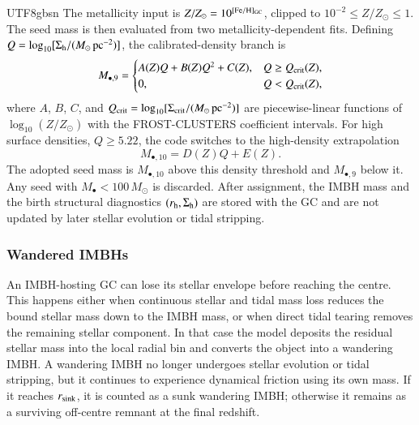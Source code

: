 \documentclass[trackchanges, twocolappendix, twocolumn]{aastex701}
\begin{document}
\begin{CJK*}{UTF8}{gbsn}
The metallicity input is \(Z/Z_{\odot}=10^{[\mathrm{Fe}/\mathrm{H}]_{\rm GC}}\), clipped to \(10^{-2}\le Z/Z_{\odot}\le 1\). The seed mass is then evaluated from two metallicity-dependent fits. Defining \(Q=\log_{10}[\Sigma_{\rm h}/(M_{\odot}\,{\rm pc}^{-2})]\), the calibrated-density branch is
\begin{equation}
M_{\bullet,9}=
\begin{cases}
A(Z)Q+B(Z)Q^2+C(Z),
& Q\ge Q_{\rm crit}(Z),\\
0, & Q<Q_{\rm crit}(Z),
\end{cases}
\end{equation}
where \(A\), \(B\), \(C\), and \(Q_{\rm crit}=\log_{10}[\Sigma_{\rm crit}/(M_{\odot}\,{\rm pc}^{-2})]\) are piecewise-linear functions of \(\log_{10}(Z/Z_{\odot})\) with the FROST-CLUSTERS coefficient intervals. For high surface densities, \(Q\ge 5.22\), the code switches to the high-density extrapolation
\begin{equation}
M_{\bullet,10}=D(Z)Q+E(Z).
\end{equation}
The adopted seed mass is \(M_{\bullet,10}\) above this density threshold and \(M_{\bullet,9}\) below it. Any seed with \(M_{\bullet}<100\,M_{\odot}\) is discarded. After assignment, the IMBH mass and the birth structural diagnostics \((r_{\rm h},\Sigma_{\rm h})\) are stored with the GC and are not updated by later stellar evolution or tidal stripping.

\subsubsection{Wandered IMBHs} \label{subsubsect:wandered_imbh}

An IMBH-hosting GC can lose its stellar envelope before reaching the centre. This happens either when continuous stellar and tidal mass loss reduces the bound stellar mass down to the IMBH mass, or when direct tidal tearing removes the remaining stellar component. In that case the model deposits the residual stellar mass into the local radial bin and converts the object into a wandering IMBH. A wandering IMBH no longer undergoes stellar evolution or tidal stripping, but it continues to experience dynamical friction using its own mass. If it reaches \(r_{\rm sink}\), it is counted as a sunk wandering IMBH; otherwise it remains as a surviving off-centre remnant at the final redshift.


\end{CJK*}
\end{document}
